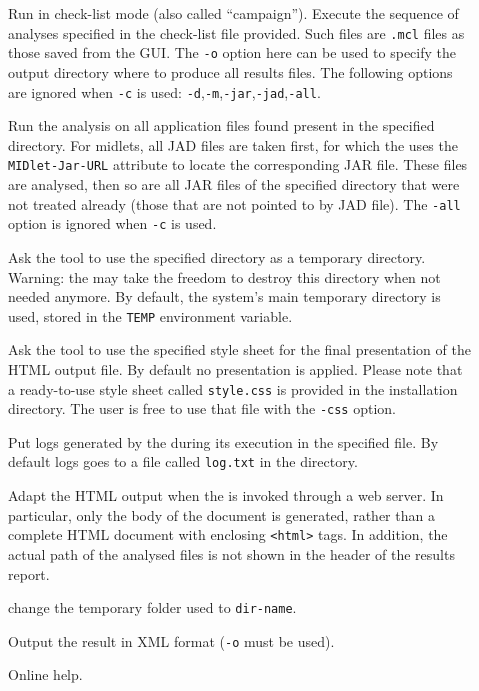 \begin{description}
\item[] Run in check-list mode (also called ``campaign''). 
Execute the sequence of analyses specified in the check-list file
provided. Such files are \texttt{.mcl} files as those saved from the GUI. The
\texttt{-o} option here can be used to specify the output directory where to
produce all results files.  The following options are ignored when \texttt{-c}
is used: \texttt{-d},\texttt{-m},\texttt{-jar},\texttt{-jad},\texttt{-all}.

\item[] Run the analysis on all application files found
  present in the specified directory. For midlets, all JAD files are taken first,
  for which the \ma uses the \texttt{MIDlet-Jar-URL} attribute to locate the
  corresponding JAR file. These files are analysed, then so are all JAR
  files of the specified directory that were not treated already
  (those that are not pointed to by JAD file). The \texttt{-all}
  option is ignored when \texttt{-c} is used.

\item[] Ask the tool to use the specified directory as a
  temporary directory. Warning: the \ma may take the freedom to
  destroy this directory when not needed anymore. By default, the
  system's main temporary directory is used, stored in the \texttt{TEMP} environment variable.

\item[] Ask the tool to use the specified
  style sheet for the final presentation of the HTML output file. By
  default no presentation is applied. Please note that a ready-to-use style
  sheet called \texttt{style.css} is provided in the installation
  directory. The user is free to use that file with the \texttt{-css}
  option.
  
\item[] Put logs generated by the \ma during its
execution in the specified file. By default logs goes to a file called
  \texttt{log.txt} in the  directory.

\item[] Adapt the HTML output when the \ma is invoked
  through a web server. In particular, only the body of the document
  is generated, rather than a complete HTML document with enclosing
  \texttt{<html>} tags. In addition, the actual path of the analysed
  files is not shown in the header of the results report.
\item[] change the temporary folder used to \verb!dir-name!.
\item[] Output the result in XML format (\texttt{-o} must be used).  

\item[] Online help.

\end{description}

